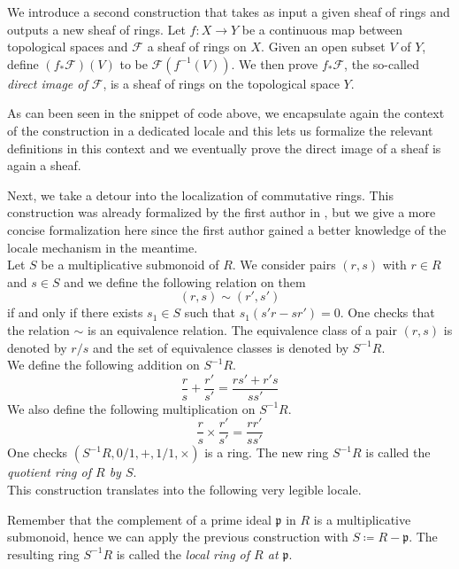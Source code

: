 \documentclass[12pt]{scrartcl}
\begin{document}

We introduce a second construction that takes as input a given sheaf of rings and outputs a new sheaf of rings. Let $f: X \rightarrow Y$ be a continuous map between topological spaces and $\mathscr{F}$ a sheaf of rings on $X$. Given an open subset $V$ of $Y$, define $(f_{*} \mathscr{F})(V)$ to be $\mathscr{F} (f^{-1}(V))$. We then prove $f_{*} \mathscr{F}$, the so-called \emph{direct image of  $\mathscr{F}$}, is a sheaf of rings on the topological space $Y$.  


As can been seen in the snippet of code above, we encapsulate again the context of the construction in a dedicated locale and this lets us formalize the relevant definitions in this context and we eventually prove the direct image of a sheaf is again a sheaf. 

Next, we take a detour into the localization of commutative rings. This construction was already formalized by the first author in \cite{bordg18}, but we give a more concise formalization here since the first author gained a better knowledge of the locale mechanism in the meantime. \\
Let $S$ be a multiplicative submonoid of $R$. We consider pairs $(r, s)$ with $r \in R$ and $s \in S$ and we define the following relation on them
	\[
	(r, s) \sim (r', s')
	\]
if and only if there exists $s_1 \in S$ such that $s_1(s' r - s r') = 0$. One checks that the relation $\sim$ is an equivalence relation. The equivalence class of a pair $(r, s)$ is denoted by $r/s$ and the set of equivalence classes is denoted by $S^{-1} R$. \\
We define the following addition on $S^{-1} R$.
	\[
	\frac{r}{s} + \frac{r'}{s'} = \frac{r s' + r' s}{s s'}
	\]
We also define the following multiplication on $S^{-1} R$. 
	\[
	\frac{r}{s} \times \frac{r'}{s'} = \frac{r r'}{s s'}
	\]
One checks $(S^{-1} R, 0/1, +, 1/1, \times)$ is a ring. The new ring $S^{-1} R$ is called the \emph{quotient ring of $R$ by $S$}. \\
This construction translates into the following very legible locale.


Remember that the complement of a prime ideal $\mathfrak{p}$ in $R$ is a multiplicative submonoid, hence we can apply the previous construction with $S \coloneqq R - \mathfrak{p}$. The resulting ring  $S^{-1} R$ is called the \emph{local ring of $R$ at $\mathfrak{p}$}. \\
\end{document}
